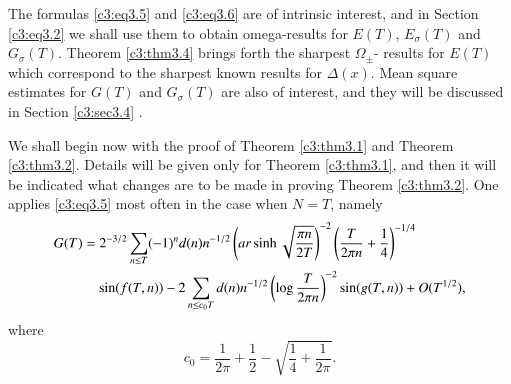 The formulas \eqref{c3:eq3.5} and \eqref{c3:eq3.6} are of intrinsic
interest, and in Section \eqref{c3:eq3.2} we shall use them to obtain
omega-results for $E(T)$, $E_\sigma (T)$ and $G_\sigma (T)$. Theorem
\ref{c3:thm3.4} brings forth the sharpest $\Omega_{\pm}$- results for
$E(T)$ which correspond to the sharpest known results for $\Delta
(x)$. Mean square estimates for $G(T)$ and $G_\sigma (T)$ are also of
interest, and they will be discussed in Section \ref{c3:sec3.4} .

We shall begin now with the proof of Theorem \ref{c3:thm3.1} and
Theorem \ref{c3:thm3.2}. Details will be given only for Theorem
\ref{c3:thm3.1}, and then it will be indicated what changes are to be
made in proving Theorem \ref{c3:thm3.2}. One applies \eqref{c3:eq3.5}
most often in the case when $N=T$, namely
{\fontsize{10pt}{12pt}\selectfont
\begin{align}
  G(T) & = 2^{-3/2} \sum_{n \leq T} (-1)^n d(n) n^{-1/2} \left(ar
  \sinh \sqrt{\frac{\pi n}{2T}} \right)^{-2} \left(\frac{T}{2 \pi n} +
  \frac{1}{4}\right)^{-1/4}\label{c3:eq3.7}\\ 
  &\quad \sin (f (T, n))
  - 2 \sum_{n \leq c_0 T} d(n) n^{-1/2} \left(\log \frac{T}{2 \pi n}
  \right)^{-2} \sin (g (T, n)) + O (T^{1/2}),\notag
\end{align}}
where
$$
c_0 = \frac{1}{2 \pi} + \frac{1}{2} - \sqrt{\frac{1}{4} + \frac{1}{2 \pi}}.
$$

